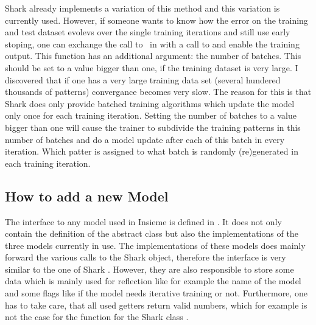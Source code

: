 Shark already implements a variation of this method and this variation is currently used. However, if someone wants to know how the error on the training and test dataset evolevs over the single training iterations and still use early stoping, one can exchange the call to~ in  with a call to  and enable the training output. This function has an additional argument: the number of batches. This should be set to a value bigger than one, if the training dataset is very large. I discovered that if one has a very large training data set (several hundered thousands of patterns) convergance becomes very slow. The reason for this is that Shark does only provide batched training algorithms which update the model only once for each training iteration. Setting the number of batches to a value bigger than one will cause the trainer to subdivide the training patterns in this number of batches and do a model update after each of this batch in every iteration. Which patter is assigned to what batch is randomly (re)generated in each training iteration.

\subsection{How to add a new Model}

The interface to any model used in Insieme is defined in . It does not only contain the definition of the abstract class  but also the implementations of the three models currently in use. The implementations of these models does mainly forward the various calls to the Shark object, therefore the interface is very similar to the one of Shark . However, they are also responsible to store some data which is mainly used for reflection like for example the name of the model and some flags like if the model needs iterative training or not. Furthermore, one has to take care, that all used getters return valid numbers, which for example is not the case for the function  for the Shark class . 

